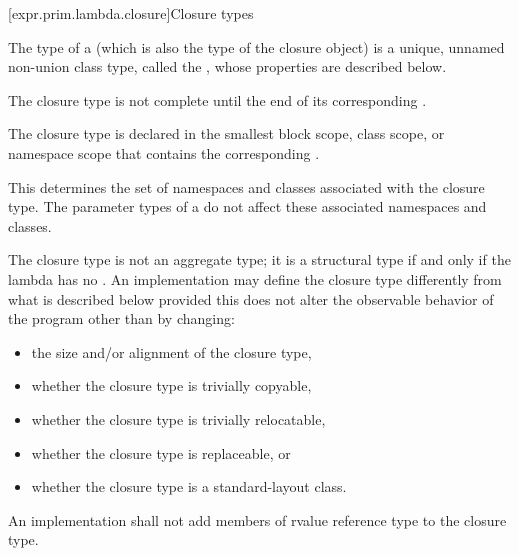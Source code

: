 [expr.prim.lambda.closure]{Closure types}%

\pnum
The type of a  (which is also the type of the
closure object) is a unique, unnamed non-union class type,
called the ,
whose properties are described below.

\pnum
The closure type is not complete
until the end of its corresponding .

\pnum
The closure type is declared in the smallest block
scope, class scope, or namespace scope that contains the corresponding
.
\begin{note}
This determines the set of namespaces and
classes associated with the closure type. The parameter
types of a  do not affect these associated namespaces and
classes.
\end{note}

\pnum
The closure type is not an aggregate type;
it is a structural type if and only if
the lambda has no .
An implementation may define the closure type differently from what
is described below provided this does not alter the observable behavior of the program
other than by changing:
\begin{itemize}
\item the size and/or alignment of the closure type,
\item whether the closure type is trivially copyable,
\item whether the closure type is trivially relocatable,
\item whether the closure type is replaceable, or
\item whether the closure type is a standard-layout class.
\end{itemize}

An implementation shall not add members of rvalue reference type to the closure
type.

